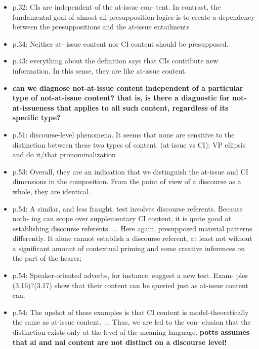 \documentclass[11pt,fleqn]{article}
\newcommand{\6}{\mbox{$[\hspace*{-.6mm}[$}}
\newcommand{\9}{\mbox{$]\hspace*{-.6mm}]$}}
\begin{document}
\begin{itemize}
\begin{itemize}
\item p.32:  CIs are independent of the at-issue con- tent. In contrast, the fundamental goal of almost all presupposition logics is to create a dependency between the presuppositions and the at-issue entailments

\item p.34: Neither at- issue content nor CI content should be presupposed.

\item p.43: everything about the definition says that CIs contribute new information. In this sense, they are like at-issue content.

\item {\bf can we diagnose not-at-issue content independent of a particular type of not-at-issue content? that is, is there a diagnostic for not-at-issueness that applies to all such content, regardless of its specific type?}

\item p.51: discourse-level phenomena. It seems that none are sensitive to the distinction between these two types of content. (at-issue vs CI): VP ellipsis and do it/that pronominalization

\item p.53: Overall, they are an indication that we distinguish the at-issue and CI dimensions in the composition. From the point of view of a discourse as a whole, they are identical.

\item p.54: A similar, and less fraught, test involves discourse referents. Because noth- ing can scope over supplementary CI content, it is quite good at establishing discourse referents. ... Here again, presupposed material patterns differently. It alone cannot establish a discourse referent, at least not without a significant amount of contextual priming and some creative inferences on the part of the hearer;

\item p.54: Speaker-oriented adverbs, for instance, suggest a new test. Exam- ples (3.16)?(3.17) show that their content can be queried just as at-issue content can.

\item p.54: The upshot of these examples is that CI content is model-theoretically the same as at-issue content. ... Thus, we are led to the con- clusion that the distinction exists only at the level of the meaning language. {\bf potts assumes that ai and nai content are not distinct on a discourse level!}


\end{itemize}
\end{itemize}
\end{document}
